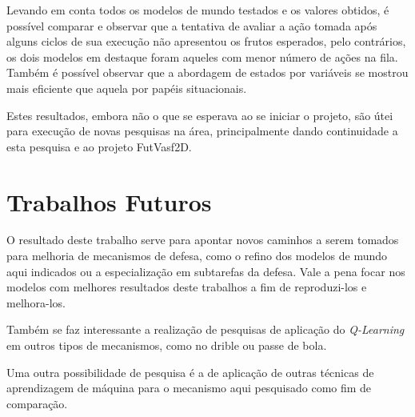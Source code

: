Levando em conta todos os modelos de mundo testados e os valores obtidos, é possível
comparar e observar que a tentativa de avaliar a ação tomada após alguns ciclos
de sua execução não apresentou os frutos esperados, pelo contrários, os dois
modelos em destaque foram aqueles com menor número de ações na fila. Também é
possível observar que a abordagem de estados por variáveis se mostrou mais
eficiente que aquela por papéis situacionais.

Estes resultados, embora não o que se esperava ao se iniciar o projeto, são útei
para execução de novas pesquisas na área, principalmente dando continuidade a
esta pesquisa e ao projeto FutVasf2D.

\section{Trabalhos Futuros}\label{sec:future}

O resultado deste trabalho serve para apontar novos caminhos a serem tomados
para melhoria de mecanismos de defesa, como o refino dos modelos de mundo aqui indicados
ou a especialização em subtarefas da defesa. Vale a pena focar nos modelos com
melhores resultados deste trabalhos a fim de reproduzi-los e melhora-los.

Também se faz interessante a realização de pesquisas de aplicação do
\textit{Q-Learning} em outros tipos de mecanismos, como no drible ou passe de
bola.

Uma outra possibilidade de pesquisa é a de aplicação de outras técnicas de
aprendizagem de máquina para o mecanismo aqui pesquisado como fim de comparação.